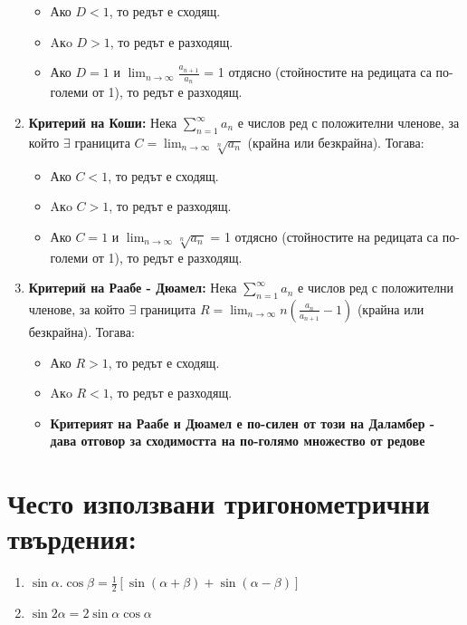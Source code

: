 \documentclass[11pt,oneside,a4paper]{article}
\begin{document}
\begin{enumerate}
    \begin{itemize}
        \item Ако \(D < 1\), то редът е сходящ.
        \item Aкo \(D > 1\), то редът е разходящ.
        \item Ако \(D = 1\) и \(\displaystyle \lim_{n \to \infty} \frac{a_{n+1}}{a_n}\) = 1 отдясно (стойностите на редицата са по-големи от 1), то редът е разходящ.
    \end{itemize}
    \item \textbf{Критерий на Коши: } Нека \(\displaystyle \sum_{n=1}^{\infty} a_n\) е числов ред с положителни членове, за който \(\exists\) границита \(C = \displaystyle \lim_{n \to \infty} \sqrt[n]{a_n}\) (крайна или безкрайна). Тогава: 
    \begin{itemize}
        \item Ако \(C < 1\), то редът е сходящ.
        \item Aкo \(C > 1\), то редът е разходящ.
        \item Ако \(C = 1\) и \(\displaystyle \lim_{n \to \infty} \sqrt[n]{a_n}\) = 1 отдясно (стойностите на редицата са по-големи от 1), то редът е разходящ.
    \end{itemize}
    \item \textbf{Критерий на Раабе - Дюамел: } Нека \(\displaystyle \sum_{n=1}^{\infty} a_n\) е числов ред с положителни членове, за който \(\exists\) границита \(R = \displaystyle \lim_{n \to \infty} n(\frac{a_n}{a_{n+1}}-1)\) (крайна или безкрайна). Тогава: 
    \begin{itemize}
        \item Ако \(R > 1\), то редът е сходящ.
        \item Aкo \(R < 1\), то редът е разходящ.
        \item \textbf{Критерият на Раабе и Дюамел е по-силен от този на Даламбер - дава отговор за сходимостта на по-голямо множество от редове}
    \end{itemize}
\end{enumerate}

\section*{Често използвани тригонометрични твърдения: }

\begin{enumerate}
    \item \(\sin{\alpha}.\cos{\beta} = \frac{1}{2}[\sin (\alpha + \beta) + \sin (\alpha - \beta)]\)
    \item \(\sin{2\alpha} = 2  \sin {\alpha} \cos {\alpha} \)
\end{enumerate}
\end{document}
